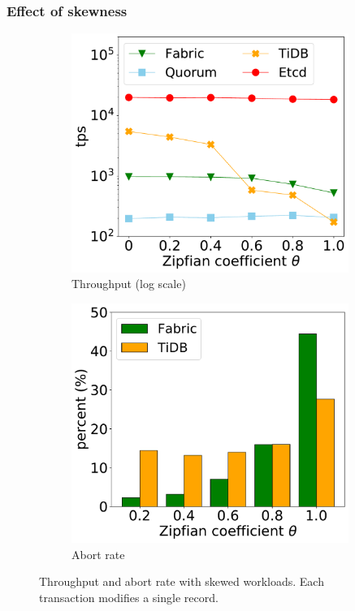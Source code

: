 \subsubsection{Effect of skewness}

\begin{figure}[tp]
	\centering
	\begin{subfigure}{0.45\textwidth}
		\includegraphics[width=0.99\textwidth]{chart/twin/skew.pdf}
		\caption{Throughput (log scale)}        
		\label{chart:twin:skew-thruput}
	\end{subfigure}
	\begin{subfigure}{0.45\textwidth}
		\includegraphics[width=0.99\textwidth]{chart/twin/skew-abort.pdf}
		\caption{Abort rate}        
		\label{chart:twin:skew-abort}
	\end{subfigure}
	\caption{Throughput and abort rate with skewed workloads. Each transaction modifies a single record.}
	\label{chart:twin:skew}
\end{figure}

